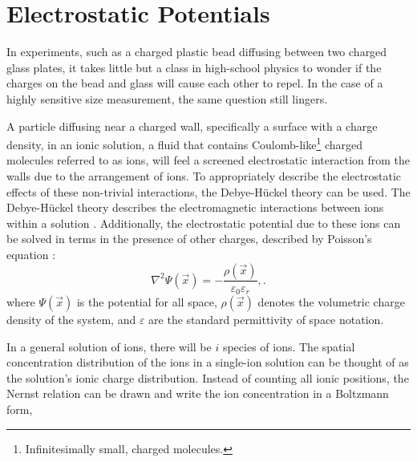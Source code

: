 
\clearpage
\section{Electrostatic Potentials}

In experiments, such as a charged plastic bead diffusing between two charged glass plates, it takes little but a class in high-school physics to wonder if the charges on the bead and glass will cause each other to repel. In the case of a highly sensitive size measurement, the same question still lingers. 

A particle diffusing near a charged wall, specifically a surface with a charge density, in an ionic solution, a fluid that contains Coulomb-like\footnote{Infinitesimally small, charged molecules.} charged molecules referred to as ions, will feel a screened electrostatic interaction from the walls due to the arrangement of ions. To appropriately describe the electrostatic effects of these non-trivial interactions, the Debye-Hückel theory can be used. The Debye-Hückel theory describes the electromagnetic interactions between ions within a solution \cite{debye1923theorie, israelachviliIntermolecularSurfaceForces}. Additionally, the electrostatic potential due to these ions can be solved in terms in the presence of other charges, described by Poisson's equation \cite{jackson_classical_1999}:
\begin{equation}
	\nabla^2 \Psi(\vec{x}) = - \frac{\rho(\vec{x})}{\varepsilon_0 \varepsilon_r}
    ,.
\end{equation}
where $\Psi(\vec{x})$ is the potential for all space, $\rho(\vec{x})$ denotes the volumetric charge density of the system, and $\varepsilon$ are the standard permittivity of space notation. 

In a general solution of ions, there will be $i$ species of ions. The spatial concentration distribution of the ions in a single-ion solution can be thought of as the solution's ionic charge distribution. Instead of counting all ionic positions, the Nernst relation can be drawn and write the ion concentration in a Boltzmann form,

